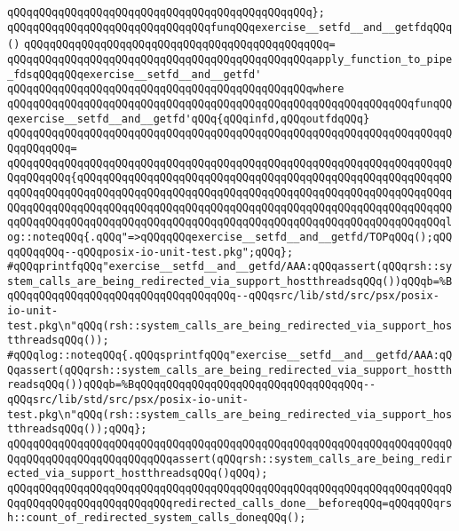 \verb|qQQqqQQqqQQqqQQqqQQqqQQqqQQqqQQqqQQqqQQqqQQqqQQq};|\newline
\newline
\verb|qQQqqQQqqQQqqQQqqQQqqQQqqQQqqQQqfunqQQqexercise__setfd__and__getfdqQQq()|\newline
\verb|qQQqqQQqqQQqqQQqqQQqqQQqqQQqqQQqqQQqqQQqqQQqqQQq=|\newline
\verb|qQQqqQQqqQQqqQQqqQQqqQQqqQQqqQQqqQQqqQQqqQQqqQQqapply_function_to_pipe_fdsqQQqqQQqexercise__setfd__and__getfd'|\newline
\verb|qQQqqQQqqQQqqQQqqQQqqQQqqQQqqQQqqQQqqQQqqQQqqQQqwhere|\newline
\verb|qQQqqQQqqQQqqQQqqQQqqQQqqQQqqQQqqQQqqQQqqQQqqQQqqQQqqQQqqQQqqQQqfunqQQqexercise__setfd__and__getfd'qQQq{qQQqinfd,qQQqoutfdqQQq}|\newline
\verb|qQQqqQQqqQQqqQQqqQQqqQQqqQQqqQQqqQQqqQQqqQQqqQQqqQQqqQQqqQQqqQQqqQQqqQQqqQQqqQQq=|\newline
\verb|qQQqqQQqqQQqqQQqqQQqqQQqqQQqqQQqqQQqqQQqqQQqqQQqqQQqqQQqqQQqqQQqqQQqqQQqqQQqqQQq{qQQqqQQqqQQqqQQqqQQqqQQqqQQqqQQqqQQqqQQqqQQqqQQqqQQqqQQqqQQqqQQqqQQqqQQqqQQqqQQqqQQqqQQqqQQqqQQqqQQqqQQqqQQqqQQqqQQqqQQqqQQqqQQqqQQqqQQqqQQqqQQqqQQqqQQqqQQqqQQqqQQqqQQqqQQqqQQqqQQqqQQqqQQqqQQqqQQqqQQqqQQqqQQqqQQqqQQqqQQqqQQqqQQqqQQqqQQqqQQqqQQqqQQqqQQqqQQqqQQqqQQqqQQqlog::noteqQQq{.qQQq"=>qQQqqQQqexercise__setfd__and__getfd/TOPqQQq();qQQqqQQqqQQq--qQQqposix-io-unit-test.pkg";qQQq};|\newline
\newline
\verb|#qQQqprintfqQQq"exercise__setfd__and__getfd/AAA:qQQqassert(qQQqrsh::system_calls_are_being_redirected_via_support_hostthreadsqQQq())qQQqb=%BqQQqqQQqqQQqqQQqqQQqqQQqqQQqqQQqqQQq--qQQqsrc/lib/std/src/psx/posix-io-unit-test.pkg\n"qQQq(rsh::system_calls_are_being_redirected_via_support_hostthreadsqQQq());|\newline
\verb|#qQQqlog::noteqQQq{.qQQqsprintfqQQq"exercise__setfd__and__getfd/AAA:qQQqassert(qQQqrsh::system_calls_are_being_redirected_via_support_hostthreadsqQQq())qQQqb=%BqQQqqQQqqQQqqQQqqQQqqQQqqQQqqQQqqQQq--qQQqsrc/lib/std/src/psx/posix-io-unit-test.pkg\n"qQQq(rsh::system_calls_are_being_redirected_via_support_hostthreadsqQQq());qQQq};|\newline
\verb|qQQqqQQqqQQqqQQqqQQqqQQqqQQqqQQqqQQqqQQqqQQqqQQqqQQqqQQqqQQqqQQqqQQqqQQqqQQqqQQqqQQqqQQqqQQqqQQqassert(qQQqrsh::system_calls_are_being_redirected_via_support_hostthreadsqQQq()qQQq);|\newline
\newline
\verb|qQQqqQQqqQQqqQQqqQQqqQQqqQQqqQQqqQQqqQQqqQQqqQQqqQQqqQQqqQQqqQQqqQQqqQQqqQQqqQQqqQQqqQQqqQQqqQQqredirected_calls_done__beforeqQQq=qQQqqQQqrsh::count_of_redirected_system_calls_doneqQQq();|\newline
